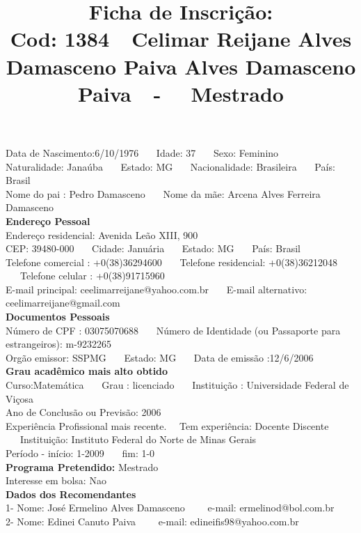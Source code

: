 \documentclass[11pt]{article}
\title{\vspace*{-4cm} Ficha de Inscrição: \\Cod: 1384\ \ Celimar Reijane Alves Damasceno Paiva Alves Damasceno Paiva\ \ - \ \ Mestrado 
 }
\date{}
\begin{document}
\maketitle
\vspace*{-1.5cm}
\noindent Data de Nascimento:6/10/1976
\ \ \ Idade: 37   \ \ \ Sexo: Feminino
\\
Naturalidade: Janaúba  
\ \ \  Estado: MG
\ \ \  Nacionalidade: Brasileira
\ \ \ País: Brasil
\\        
Nome do pai : Pedro Damasceno 
\ \ \ Nome da mãe: Arcena Alves Ferreira Damasceno          
\\[0.2cm]                     
\textbf{Endereço Pessoal} 
\\ 
\noindent Endereço residencial: Avenida Leão XIII, 900
\\
        CEP: 39480-000 
\ \ \ Cidade: Januária 
\ \ \ Estado: MG 
\ \ \ País: Brasil
\\		
		Telefone comercial : +0(38)36294600
\ \ \ Telefone residencial: +0(38)36212048
\ \ \ Telefone celular : +0(38)91715960
\\
E-mail principal: ceelimarreijane@yahoo.com.br
\ \ \ E-mail alternativo: ceelimarreijane@gmail.com 
\\[0.2cm] 
\textbf{Documentos Pessoais}
\\
\noindent Número de CPF : 03075070688
\ \ \ Número de Identidade (ou Passaporte para estrangeiros): m-9232265
\\
Orgão emissor: SSPMG
\ \ \ Estado: MG
\ \ \ Data de emissão :12/6/2006
\\[0.3cm]
\textbf{Grau acadêmico mais alto obtido}
\\	
Curso:Matemática
\ \ \ Grau : licenciado
\ \ \ Instituição : Universidade Federal de Viçosa
\\			
Ano de Conclusão ou Previsão: 2006
\\ 
Experiência Profissional mais recente. \ \  
Tem experiência: Docente Discente  
\ \ \ Instituição: Instituto Federal do Norte de Minas Gerais
\\  
Período - início: 1-2009
\ \ \ fim: 1-0
\\[0.2cm] 
\textbf{Programa Pretendido:} Mestrado\\
Interesse em bolsa: Nao
\\[0.3cm]		
\textbf{Dados dos Recomendantes} 
\\
1- Nome: José Ermelino Alves Damasceno
\ \ \ \  e-mail: ermelinod@bol.com.br 
\\
2- Nome: Edinei Canuto Paiva
\ \ \ \ e-mail: edineifis98@yahoo.com.br
\end{document}
